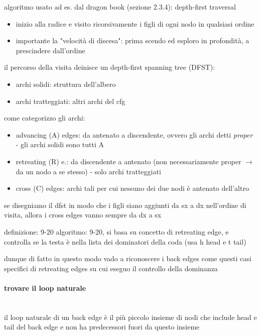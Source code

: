 algoritmo usato ad es. dal dragon book (sezione 2.3.4): depth-first traversal

\begin{itemize}
  \item inizio alla radice e visito ricorsivamente i figli di ogni nodo in qualsiasi ordine
  \item importante la "velocit\`a di discesa": prima scendo ed esploro in profondit\`a, a prescindere dall'ordine
\end{itemize}

il percorso della visita deinisce un depth-first spanning tree (DFST):
\begin{itemize}
  \item archi solidi: struttura dell'albero
  \item archi tratteggiati: altri archi del cfg
\end{itemize}

come categorizzo gli archi:
\begin{itemize}
  \item advancing (A) edges: da antenato a discendente, ovvero gli archi detti \textit{proper} - gli archi solidi sono tutti A
  \item retreating (R) e.: da discendente a antenato (non necessariamente proper $\rightarrow$ da un nodo a se stesso) - solo archi tratteggiati
  \item cross (C) edges: archi tali per cui nessuno dei due nodi \`e antenato dell'altro
\end{itemize}

\begin{emphasize}
    se disegniamo il dfst in modo che i figli siano aggiunti da sx a dx nell'ordine di visita, allora i cross edges vanno sempre da dx a sx
\end{emphasize}

definizione: 9-20
algoritmo: 9-20, si basa su concetto di retreating edge, e controlla se la testa \`e nella lista dei dominatori della coda (usa h head e t tail)

dunque di fatto in questo modo vado a riconoscere i back edges come questi casi specifici di retreating edges su cui eseguo il controllo della dominanza

\paragraph{trovare il loop naturale}~\\

il loop naturale di un back edge \`e il pi\`u piccolo insieme di nodi che include head e tail del back edge e non ha predecessori fuori da questo insieme 

